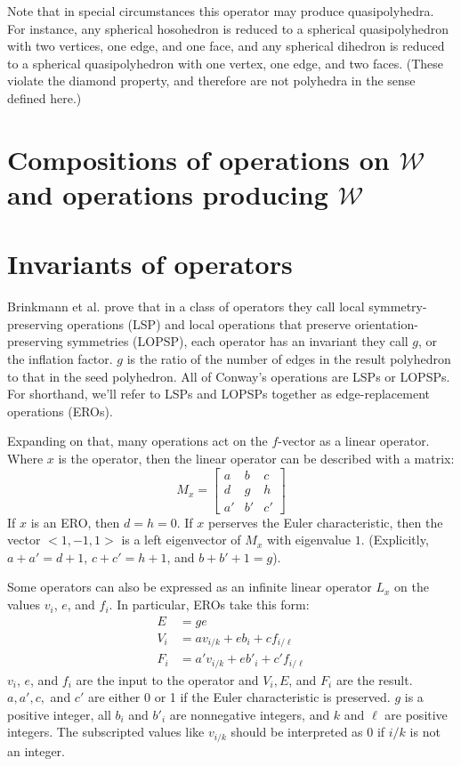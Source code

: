 \documentclass{amsart}[12pt]
\begin{document}
Note that in special circumstances this operator may produce quasipolyhedra.
For instance, any spherical hosohedron is reduced to a spherical quasipolyhedron
with two vertices, one edge, and one face, and any spherical dihedron
is reduced to a spherical quasipolyhedron with one vertex, one edge, and
two faces. (These violate the diamond property, and therefore are not
polyhedra in the sense defined here.)

\section{Compositions of operations on $\mathcal{W}$ and
          operations producing $\mathcal{W}$}


\section{Invariants of operators}
Brinkmann et al. \cite{brinkmann} prove that in a class of operators they call
local symmetry-preserving operations (LSP) and local operations that preserve
orientation-preserving symmetries (LOPSP), each operator has an invariant they
call $g$, or the inflation factor. $g$ is the ratio of the number of edges
in the result polyhedron to that in the seed polyhedron. All of Conway's
operations are LSPs or LOPSPs. For shorthand, we'll refer to LSPs and LOPSPs
together as edge-replacement operations (EROs).

Expanding on that, many operations act on the $f$-vector as a linear operator.
Where $x$ is the operator, then the linear operator can be described with a
matrix:
\begin{equation}
  M_x = \begin{bmatrix}
  a & b & c \\
  d & g & h \\
  a' & b' & c' \end{bmatrix}
\end{equation}
If $x$ is an ERO, then $d = h= 0$. If $x$ perserves the Euler characteristic,
then the vector $<1,-1,1>$ is a left eigenvector of $M_x$ with eigenvalue $1$.
(Explicitly, $a + a' = d + 1$, $c+ c' = h+1$, and $b + b' + 1 = g$).

Some operators can also be expressed as an infinite linear operator $L_x$ on
the values $v_i$, $e$, and $f_i$. In particular, EROs take this form:
\begin{equation}
  \begin{split}
  E & = ge \\
  V_i & = a v_{i/k} + e b_i + c f_{i/\ell} \\
  F_i & = a' v_{i/k} + e b'_i + c' f_{i/\ell}
  \end{split}
\end{equation}
$v_i$, $e$, and $f_i$ are the input to the operator and $V_i, E$, and $F_i$ are
the result. $a, a', c,$ and $c'$ are either 0 or 1 if the Euler characteristic
is preserved. $g$ is a positive integer, all $b_i$ and $b'_i$ are nonnegative
integers, and $k$ and $\ell$ are positive integers. The subscripted values like
$v_{i/k}$ should be interpreted as 0 if $i/k$ is not an integer.
\end{document}
